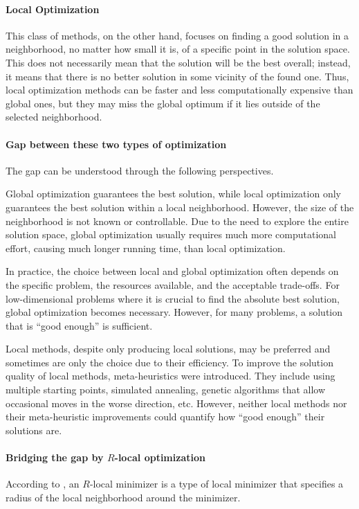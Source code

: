 \paragraph{Local Optimization} This class of methods, on the other hand, focuses on finding a good solution in a neighborhood, no matter how small it is, of a specific point in the solution space. This does not necessarily mean that the solution will be the best overall; instead, it means that there is no better solution in some vicinity of the found one. Thus, local optimization methods can be faster and less computationally expensive than global ones, but they may miss the global optimum if it lies outside of the selected neighborhood.

\paragraph{Gap between these two types of optimization} The gap can be understood through the following perspectives.

Global optimization guarantees the best solution, while local optimization only guarantees the best solution within a local neighborhood. However, the size of the neighborhood is not known or controllable.
Due to the need to explore the entire solution space, global optimization usually requires much more computational effort, causing much longer running time, than local optimization.

In practice, the choice between local and global optimization often depends on the specific problem, the resources available, and the acceptable trade-offs. For low-dimensional problems where it is crucial to find the absolute best solution, global optimization becomes necessary. However, for many problems, a solution that is ``good enough'' is sufficient. 

Local methods, despite only producing local solutions, may be preferred and sometimes are only the choice due to their efficiency. 
To improve the solution quality of local methods, meta-heuristics were introduced. They include using multiple starting points, simulated annealing, genetic algorithms that allow occasional moves in the worse direction, etc.
However, neither local methods nor their meta-heuristic improvements could quantify how ``good enough'' their solutions are.

\paragraph{Bridging the gap by $R$-local optimization}
According to \cite{chen2019run}, 
an $R$-local minimizer is a type of local minimizer that specifies a radius of the local neighborhood around the minimizer.

